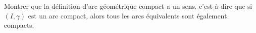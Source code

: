 \begin{exercice}\label{exoGeomAnal-0001}

	Montrer que la définition d'arc géométrique compact a un sens, c'est-à-dire que si $(I,\gamma)$ est un arc compact, alors tous les arcs équivalents sont également compacts.

\end{exercice}
